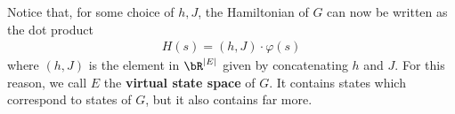 \documentclass[raggedright, nofonts, notitlepage, openany, debug]{tufte-book}
\begin{document}
Notice that, for some choice of $h,J$, the Hamiltonian of $G$ can now be written as the dot product
\begin{align*}
  H(s) = (h,J) \cdot \varphi(s)
\end{align*}
where $(h,J)$ is the element in $\bR^{|E|}$ given by concatenating $h$ and $J$. For this reason, we call $E$ the \textbf{virtual state space} of $G$. It contains states which correspond to states of $G$, but it also contains far more.

\newpage


\end{document}
